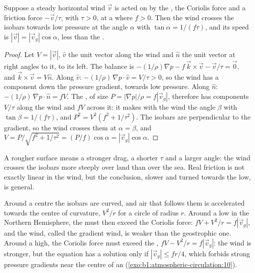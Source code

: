 \begin{proposition}\label{prop:b1:atmospheric-circulation:friction}
Suppose a steady horizontal wind $\vec v$ is acted on by the ,
the Coriolis force and a friction force $-\vec v/\tau$, with $\tau > 0$, at a
 where $f > 0$. Then the wind crosses the isobars towards low pressure at
the angle $\alpha$ with $\tan\alpha = 1/(f\tau)$, and its speed is $|\vec v| =
|\vec v_g|\cos\alpha$, less than the .
\end{proposition}

\begin{proof}
Let $V = |\vec v|$, $\hat v$ the unit vector along the wind and $\hat n$ the unit
vector at right angles to it, to its left. The balance is $-(1/\rho)\nabla p - f\,
\vec k\times\vec v - \vec v/\tau = \vec 0$, and $\vec k\times\vec v = V\hat n$.
Along $\hat v$: $-(1/\rho)\,\nabla p\cdot\hat v = V/\tau > 0$, so the wind has a
component down the pressure gradient, towards low pressure. Along $\hat n$:
$-(1/\rho)\,\nabla p\cdot\hat n = fV$. The , of size $P =
|\nabla p|/\rho = f|\vec v_g|$, therefore has components $V/\tau$ along the wind and
$fV$ across it: it makes with the wind the angle $\beta$ with $\tan\beta =
1/(f\tau)$, and $P^2 = V^2(f^2 + 1/\tau^2)$. The isobars are perpendicular to the
gradient, so the wind crosses them at $\alpha = \beta$, and $V = P/\sqrt{f^2 +
1/\tau^2} = (P/f)\cos\alpha = |\vec v_g|\cos\alpha$.
\end{proof}

A rougher surface means a stronger drag, a shorter $\tau$ and a larger angle:
the wind crosses the isobars more steeply over land than over the sea. Real friction
is not exactly linear in the wind, but the conclusion, slower and turned towards
the low, is general.

\begin{remark}\label{rem:b1:atmospheric-circulation:gradient}
Around a centre the isobars are curved, and air that follows them is accelerated
towards the centre of curvature, $V^2/r$ for a circle of radius $r$. Around a low in
the Northern Hemisphere, the  must then exceed the Coriolis
force: $fV + V^2/r = f|\vec v_g|$, and the wind, called the gradient wind, is
weaker than the geostrophic one. Around a high, the Coriolis force must exceed the
, $fV - V^2/r = f|\vec v_g|$: the wind is stronger, but the
equation has a solution only if $|\vec v_g| \leq fr/4$, which forbids strong pressure
gradients near the centre of an  (\cref{exo:b1:atmospheric-circulation:10}).
\end{remark}

